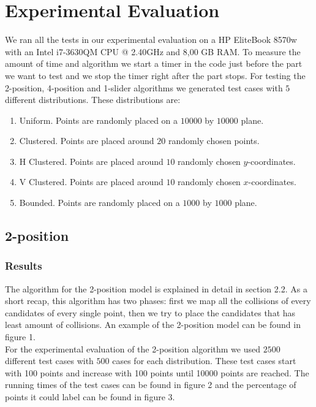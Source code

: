 \documentclass[crop=false,a4paper,oneside,11pt]{standalone}
\begin{document}
\section{Experimental Evaluation}

We ran all the tests in our experimental evaluation on a HP EliteBook 8570w with an Intel i7-3630QM CPU @ 2.40GHz and 8,00 GB RAM. To measure the amount of time and algorithm we start a timer in the code just before the part we want to test and we stop the timer right after the part stops. For testing the 2-position, 4-position and 1-slider algorithms we generated test cases with $5$ different distributions. These distributions are:
\begin{enumerate}
    \item Uniform. Points are randomly placed on a $10000$ by $10000$ plane.
    \item Clustered. Points are placed around $20$ randomly chosen points.
    \item H Clustered. Points are placed around $10$ randomly chosen $y$-coordinates.
    \item V Clustered. Points are placed around $10$ randomly chosen $x$-coordinates.
    \item Bounded. Points are randomly placed on a $1000$ by $1000$ plane.
\end{enumerate}

\subsection{2-position}
\subsubsection{Results}
The algorithm for the 2-position model is explained in detail in section 2.2. As a short recap, this algorithm has two phases: first we map all the collisions of every candidates of every single point, then we try to place the candidates that has least amount of collisions. An example of the 2-position model can be found in figure 1.\\
For the experimental evaluation of the 2-position algorithm we used $2500$ different test cases with $500$ cases for each distribution. These test cases start with 100 points and increase with 100 points until 10000 points are reached. The running times of the test cases can be found in figure 2 and the percentage of points it could label can be found in figure 3.\\
\end{document}
